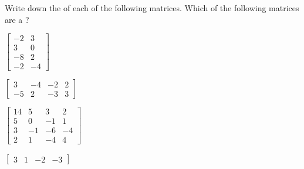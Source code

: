 \begin{exercise}  
Write down the  of each of the following matrices.
Which of the following matrices are a ?
\begin{Parts}
\item \(\begin{bmatrix} -2&3
\\3&0
\\-8&2
\\-2&-4 \end{bmatrix}\)

\item \(\begin{bmatrix} 3&-4&-2&2
\\-5&2&-3&3 \end{bmatrix}\)

\item \(\begin{bmatrix} 14&5&3&2 
\\5&0&-1&1 
\\3&-1&-6&-4
\\2&1&-4&4 \end{bmatrix}\)

\begin{reduce}
\item \(\begin{bmatrix} 3&1&-2&-3 \end{bmatrix}\)
\answer{\(\protect\begin{bmat} 3
\protect\\1
\protect\\-2
\protect\\-3 \protect\end{bmat}\)}


\end{reduce}
\end{Parts}
\end{exercise}
